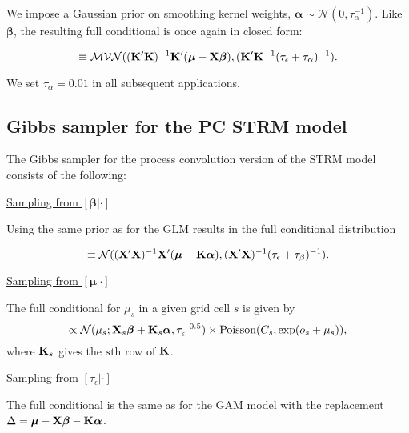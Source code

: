 \documentclass[12pt,fleqn]{article}
\begin{document}
\begin{flushleft}
We impose a Gaussian prior on smoothing kernel weights, $\boldsymbol{\alpha} \sim \mathcal{N}(0,\tau_\alpha^{-1})$.  Like $\boldsymbol{\beta}$, the resulting full conditional is once again in closed form:
\begin{linenomath*}
\begin{equation*}
   [\boldsymbol{\alpha} | \cdot] \equiv \mathcal{MVN}(({\bf K}^\prime {\bf K})^{-1}{\bf K}^\prime (\boldsymbol{\mu}-{\bf X}\boldsymbol{\beta}),({\bf K}^\prime {\bf K}^{-1} (\tau_\epsilon + \tau_\alpha)^{-1}).
\end{equation*}
\end{linenomath*}
We set $\tau_\alpha = 0.01$ in all subsequent applications.

\subsection{Gibbs sampler for the PC STRM model}

The Gibbs sampler for the process convolution version of the STRM model consists of the following:

\underline{Sampling from $[\boldsymbol{\beta}|\cdot]$}

Using the same prior as for the GLM results in the full conditional distribution
\begin{linenomath*}
\begin{equation*}
   [\boldsymbol{\beta} | \cdot] \equiv \mathcal{N}(({\bf X}^\prime {\bf X})^{-1}{\bf X}^\prime (\boldsymbol{\mu}-{\bf K}\boldsymbol{\alpha}),({\bf X}^\prime {\bf X})^{-1} (\tau_\epsilon + \tau_\beta)^{-1}).
\end{equation*}
\end{linenomath*}

\underline{Sampling from $[\boldsymbol{\mu}|\cdot]$}

The full conditional for $\mu_s$ in a given grid cell $s$ is given by
\begin{equation*}
  [\mu_{s,t} | \cdot] \propto \mathcal{N}(\mu_s;{\bf X}_s \boldsymbol{\beta}+{\bf K}_s \boldsymbol{\alpha},\tau_\epsilon^{-0.5}) \times \textrm{Poisson}(C_s,\exp(o_s+\mu_s)),
\end{equation*}
where ${\bf K}_s$ gives the $s$th row of ${\bf K}$.

\underline{Sampling from $[\tau_\epsilon|\cdot]$}

The full conditional is the same as for the GAM model with the replacement $\Delta = \boldsymbol{\mu}-{\bf X}\boldsymbol{\beta}-{\bf K}\boldsymbol{\alpha}$.


\end{flushleft}
\end{document}
